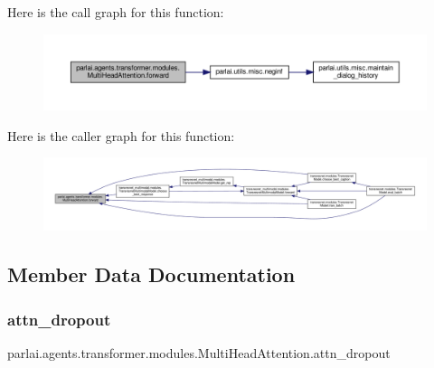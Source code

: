 Here is the call graph for this function\+:
\nopagebreak
\begin{figure}[H]
\begin{center}
\leavevmode
\includegraphics[width=350pt]{classparlai_1_1agents_1_1transformer_1_1modules_1_1MultiHeadAttention_a0685acda3d791bccfb9a6f4ff2c3680f_cgraph}
\end{center}
\end{figure}
Here is the caller graph for this function\+:
\nopagebreak
\begin{figure}[H]
\begin{center}
\leavevmode
\includegraphics[width=350pt]{classparlai_1_1agents_1_1transformer_1_1modules_1_1MultiHeadAttention_a0685acda3d791bccfb9a6f4ff2c3680f_icgraph}
\end{center}
\end{figure}


\subsection{Member Data Documentation}
\mbox{\label{classparlai_1_1agents_1_1transformer_1_1modules_1_1MultiHeadAttention_ac1c0169222b929c580d1a786479d7ed2}} 
\subsubsection{\texorpdfstring{attn\+\_\+dropout}{attn\_dropout}}
{\footnotesize\ttfamily parlai.\+agents.\+transformer.\+modules.\+Multi\+Head\+Attention.\+attn\+\_\+dropout}



